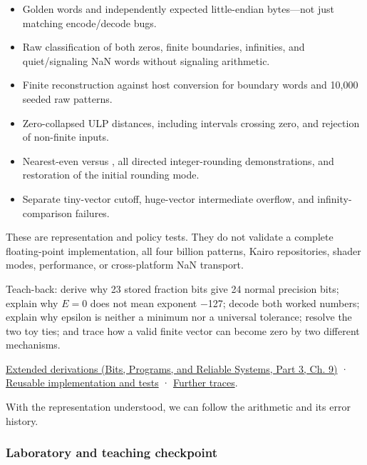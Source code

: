 \begin{itemize}
\tightlist
\item
  Golden words and independently expected little-endian bytes---not just matching encode/decode bugs.
\item
  Raw classification of both zeros, finite boundaries, infinities, and quiet/signaling NaN words without signaling arithmetic.
\item
  Finite reconstruction against host conversion for boundary words and 10,000 seeded raw patterns.
\item
  Zero-collapsed ULP distances, including intervals crossing zero, and rejection of non-finite inputs.
\item
  Nearest-even versus , all directed integer-rounding demonstrations, and restoration of the initial rounding mode.
\item
  Separate tiny-vector cutoff, huge-vector intermediate overflow, and infinity-comparison failures.
\end{itemize}

These are representation and policy tests. They do not validate a complete floating-point implementation, all four billion patterns, Kairo repositories, shader modes, performance, or cross-platform NaN transport.

Teach-back: derive why 23 stored fraction bits give 24 normal precision bits; explain why \(E=0\) does not mean exponent −127; decode both worked numbers; explain why epsilon is neither a minimum nor a universal tolerance; resolve the two toy ties; and trace how a valid finite vector can become zero by two different mechanisms.

\href{../01-Bits-Programs-and-Reliable-Systems-P03/main.pdf\#nameddest=01-foundations-i-ch011-m004---floating-point-fields-spacing-and-rounding}{Extended derivations (Bits, Programs, and Reliable Systems, Part 3, Ch. 9)} · \hyperref[appendix-4e2236f53445-m004---binary-interchange-inspection-and-strict-rounding-laboratory]{Reusable implementation and tests} · \hyperref[appendix-92ff77d4dfdc-m004---from-fields-to-values-and-failure-paths]{Further traces}.

With the representation understood, we can follow the arithmetic and its error history.

\subsubsection{Laboratory and teaching checkpoint}\label{01-foundations-i-ch001-laboratory-and-teaching-checkpoint}

